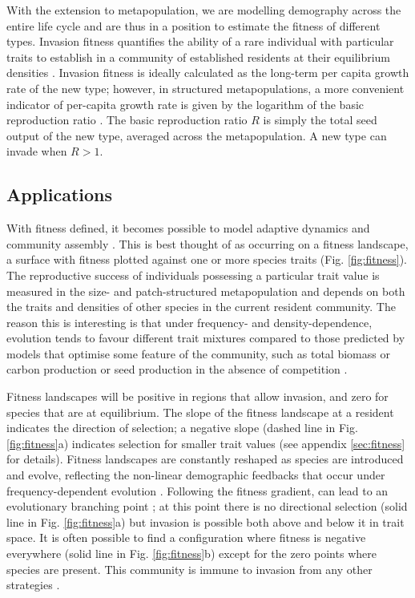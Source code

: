 \documentclass[a4paper,11pt]{article}
\begin{document}
With the extension to metapopulation, we are modelling demography across
the entire life cycle and are thus in a position to estimate the fitness
of different types. Invasion fitness quantifies the ability of a rare
individual with particular traits to establish in a community of
established residents at their equilibrium densities \citep{Metz-1992}.
Invasion fitness
is ideally calculated as the long-term per capita growth rate of the new
type; however, in structured metapopulations, a more convenient
indicator of per-capita growth rate is given by the logarithm of the
basic reproduction ratio \citep{Gyllenberg-2001, Metz-2001}. The basic
reproduction ratio \(R\) is simply the total seed output of the new
type, averaged across the metapopulation. A new type can invade when
\(R > 1\).

\subsection{Applications}

With fitness defined, it becomes possible to model adaptive dynamics
and community assembly \citep{Geritz-1998,Dieckmann-2007}. This is best
thought of as occurring on a fitness landscape, a surface with fitness
plotted against one or more species traits (Fig. \ref{fig:fitness}). The
reproductive success of individuals possessing a particular trait value
is measured in the size- and patch-structured metapopulation and
depends on both the traits and densities of other species in the current
resident community. The reason this is interesting is that under
frequency- and density-dependence, evolution tends to favour different
trait mixtures compared to those predicted by models that optimise some
feature of the community, such as total biomass or carbon production or
seed production in the absence of competition
\citep{Falster-2003, Dieckmann-2007}.

Fitness landscapes will be positive in regions that allow invasion,
and zero for species that are at equilibrium. The slope of the fitness
landscape at a resident indicates the direction of selection; a
negative slope (dashed line in Fig. \ref{fig:fitness}a) indicates
selection for smaller trait values (see appendix \ref{sec:fitness} for
details). Fitness landscapes are constantly reshaped as species are
introduced and evolve, reflecting the non-linear demographic feedbacks
that occur under frequency-dependent evolution
\citep{Geritz-1998,Dieckmann-2007}. Following the fitness gradient,
can lead to an evolutionary branching point
\citep{Geritz-1998,Dieckmann-2007}; at this point there is no
directional selection (solid line in Fig. \ref{fig:fitness}a) but
invasion is possible both above and below it in trait space. It is
often possible to find a configuration where fitness is negative
everywhere (solid line in Fig. \ref{fig:fitness}b) except for the zero
points where species are present. This community is immune to invasion
from any other strategies \citep{Geritz-1998}.
\end{document}
